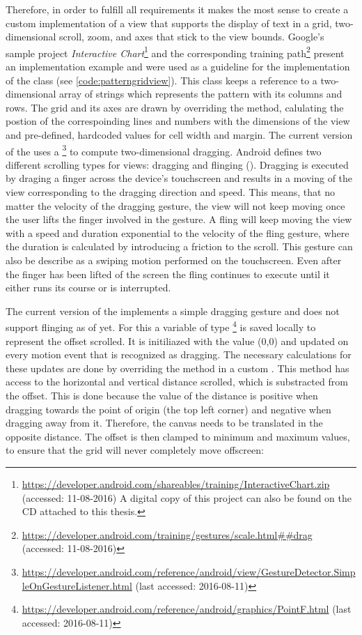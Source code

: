 Therefore, in order to fulfill all requirements it makes the most sense to create a custom implementation of a view that supports the display of text in a grid, two-dimensional scroll, zoom, and axes that stick to the view bounds. Google's sample project \textit{Interactive Chart}\footnote{\url{https://developer.android.com/shareables/training/InteractiveChart.zip} (accessed: 11-08-2016) A digital copy of this project can also be found on the CD attached to this thesis.} and the corresponding training path\footnote{\url{https://developer.android.com/training/gestures/scale.html##drag} (accessed: 11-08-2016)} present an implementation example and were used as a guideline for the implementation of the class  (see \ref{code:patterngridview}). This class keeps a reference to a two-dimensional array of strings which represents the pattern with its columns and rows. The grid and its axes are drawn by overriding the  method, calulating the postion of the correspoinding lines and numbers with the dimensions of the view and pre-defined, hardcoded values for cell width and margin. The current version of the  uses a \footnote{\url{https://developer.android.com/reference/android/view/GestureDetector.SimpleOnGestureListener.html} (last accessed: 2016-08-11)} to compute two-dimensional dragging. Android defines two different scrolling types for views: dragging and flinging (\cite{android_scrolling_types}). Dragging is executed by draging a finger across the device's touchscreen and results in a moving of the view corresponding to the dragging direction and speed. This means, that no matter the velocity of the dragging gesture, the view will not keep moving once the user lifts the finger involved in the gesture. A fling will keep moving the view with a speed and duration exponential to the velocity of the fling gesture, where the duration is calculated by introducing a friction to the scroll. This gesture can also be describe as a swiping motion performed on the touchscreen. Even after the finger has been lifted of the screen the fling continues to execute until it either runs its course or is interrupted.

The current version of the  implements a simple dragging gesture and does not support flinging as of yet. For this a variable of type \footnote{\url{https://developer.android.com/reference/android/graphics/PointF.html} (last accessed: 2016-08-11)} is saved locally to represent the offset scrolled. It is initiliazed with the value (0,0) and updated on every motion event that is recognized as dragging. The necessary calculations for these updates are done by overriding the  method in a custom . This method has access to the horizontal and vertical distance scrolled, which is substracted from the offset. This is done because the value of the distance is positive when dragging towards the point of origin (the top left corner) and negative when dragging away from it. Therefore, the canvas needs to be translated in the opposite distance. The offset is then clamped to minimum and maximum values, to ensure that the grid will never completely move offscreen: 

